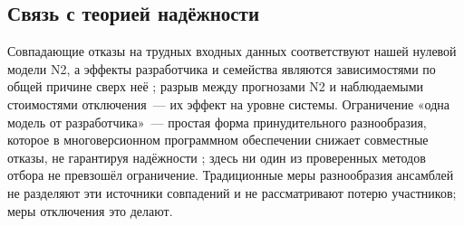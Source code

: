 \documentclass[preprint,12pt,authoryear]{elsarticle}
\begin{document}
\subsection{Связь с теорией надёжности}
Совпадающие отказы на трудных входных данных \citep{eckhardt1985,knight1986} соответствуют нашей нулевой модели N2, а эффекты разработчика и семейства являются зависимостями по общей причине сверх неё \citep{iaea1992ccf}; разрыв между прогнозами N2 и наблюдаемыми стоимостями отключения~--- их эффект на уровне системы. Ограничение «одна модель от разработчика»~--- простая форма принудительного разнообразия, которое в многоверсионном программном обеспечении снижает совместные отказы, не гарантируя надёжности \citep{littlewood1989}; здесь ни один из проверенных методов отбора не превзошёл ограничение. Традиционные меры разнообразия ансамблей \citep{kuncheva2003} не разделяют эти источники совпадений и не рассматривают потерю участников; меры отключения это делают.
\end{document}
